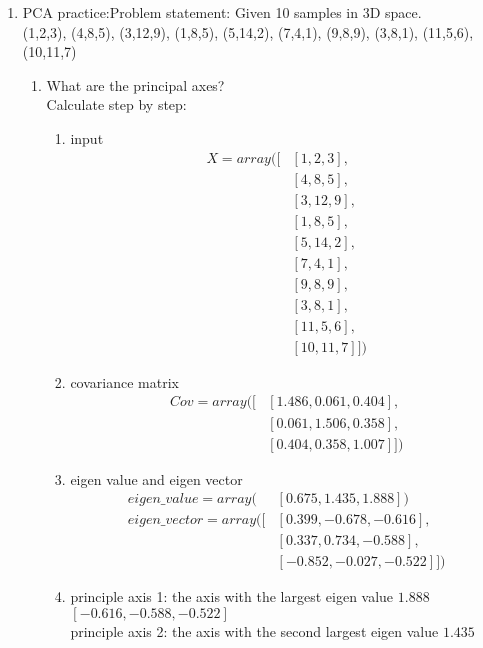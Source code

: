\documentclass[12pt, a4paper]{article}
\begin{document}
\begin{enumerate}
\item PCA practice:Problem statement: Given 10 samples in 3D space.\\
(1,2,3), (4,8,5), (3,12,9), (1,8,5), (5,14,2), (7,4,1), (9,8,9), (3,8,1), (11,5,6), (10,11,7)\\
\begin{enumerate}
    \item What are the principal axes?\\
    Calculate step by step:
    \begin{enumerate}
        \item input
        \begin{align*}X = array([&[ 1,  2,  3],\\
       &[ 4,  8,  5],\\
       &[ 3, 12,  9],\\
       &[ 1,  8,  5],\\
       &[ 5, 14,  2],\\
       &[ 7,  4,  1],\\
       &[ 9,  8,  9],\\
       &[ 3,  8,  1],\\
       &[11,  5,  6],\\
       &[10, 11,  7]])\end{align*}
       \item covariance matrix\\
       \begin{align*}
            Cov = array([&[1.486, 0.061 , 0.404],\\
                   &[0.061 , 1.506, 0.358],\\
                   &[0.404, 0.358, 1.007]])
       \end{align*}
       \item eigen value and eigen vector\\
       \begin{align*}
            eigen\_value = array(&[0.675, 1.435, 1.888])\\
            eigen\_vector = array([&[ 0.399, -0.678, -0.616],\\
            &[ 0.337,  0.734, -0.588],\\
            &[-0.852, -0.027, -0.522]])
       \end{align*}
    \item principle axis 1: the axis with the largest eigen value $1.888$\\
    $[-0.616, -0.588, -0.522]$\\
    principle axis 2: the axis with the second largest eigen value $1.435$\\

\end{enumerate}
\end{enumerate}
\end{enumerate}
\end{document}
